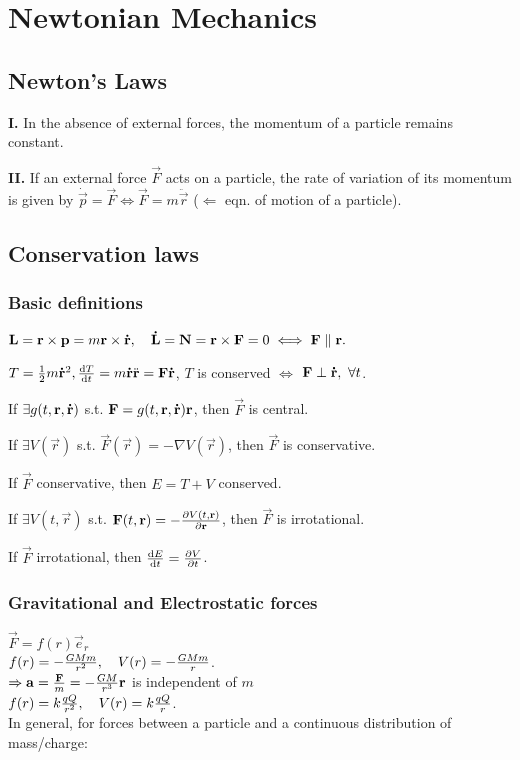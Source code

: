 \section{Newtonian Mechanics}



\subsection{Newton's Laws}
\textbf{\color{myblue} I.} In the absence of external forces, the momentum of a particle remains constant.

\textbf{\color{myblue} II.} If an external force $\vec{F}$ acts on a particle, the rate of variation of its momentum is given by $\dot{\vec{p}}=\vec{F}\iff \vec{F}=m\ddot{\vec{r}}$ ($\Leftarrow$ eqn. of motion of a particle).


\subsection{Conservation laws}


\subsubsection*{Basic definitions}
$\mathbf{L}=\mathbf{r}\times \mathbf{p}=m\mathbf{r}\times \accentset{\mbox{\bfseries .}}{\mathbf{r}},\hspace{1em} \accentset{\mbox{\bfseries .}}{\mathbf{L}}=\mathbf{N}=\mathbf{r}\times \mathbf{F}=0\iff \mathbf{F}\parallel \mathbf{r}.$

$T=\frac{1}{2}m\accentset{\mbox{\bfseries .}}{\mathbf{r}}^{2}, \dv{T}{t}=m\accentset{\mbox{\bfseries .}}{\mathbf{r}}\ddot{\mathbf{r}}=\mathbf{F}\accentset{\mbox{\bfseries .}}{\mathbf{r}}$, $T$ is conserved $\iff$ $\mathbf{F}\perp\accentset{\mbox{\bfseries .}}{\mathbf{r}},\ \forall t$.\hfill {}

If $\exists g(t,\mathbf{r},\accentset{\mbox{\bfseries .}}{\mathbf{r}})$ s.t. $\mathbf{F}=g(t,\mathbf{r},\accentset{\mbox{\bfseries .}}{\mathbf{r}})\mathbf{r}$, then $\vec{F}$ is central. \hfill {}

If $\exists V(\vec{r})$ s.t. $\vec{F}(\vec{r})=-\nabla V(\vec{r})$, then $\vec{F}$ is conservative.\hfill {}

If $\vec{F}$ conservative, then $E=T+V$ conserved.

If $\exists V(t,\vec{r})$ s.t. $\mathbf{F}(t,\mathbf{r})=-\pdv{V(t,\mathbf{r})}{\mathbf{r}}$, then $\vec{F}$ is irrotational.

If $\vec{F}$ irrotational, then $\dv{E}{t}=\pdv{V}{t}$.



\subsubsection*{Gravitational and Electrostatic forces}
$\vec{F}=f(r)\vec{e}_{r}$\\
$f(r)=-\frac{GMm}{r^{2}},\hspace{1em} V(r)=-\frac{GMm}{r}$.\\
$\Rightarrow \mathbf{a}=\frac{\mathbf{F}}{m}=-\frac{GM}{r^{3}}\mathbf{r}$ is independent of $m$\\
$f(r)=k\frac{qQ}{r^{2}},\hspace{1em} V(r)=k\frac{qQ}{r}$.\\
In general, for forces between a particle and a continuous distribution of mass/charge:

